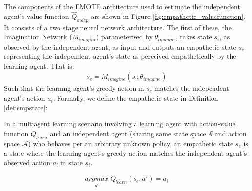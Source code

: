 The components of the EMOTE architecture used to estimate the independent agent's value function $\hat{Q}_{indep}$ are shown in Figure \ref{fig:empathetic_valuefunction}. It consists of a two stage neural network architecture. The first of these, the Imagination Network ($M_{imagine}$) parameterised by $\theta_{imagine}$, takes state $s_{i}$, as observed by the independent agent, as input and outputs an empathetic state $s_{e}$ representing the independent agent's state as perceived empathetically by the learning agent. That is:
\begin{eqnarray}
s_{e} = M_{imagine}(s_{i};\theta_{imagine})
\label{eqn:IM_formula}
\end{eqnarray} 
Such that the learning agent's greedy action in $s_e$ matches the independent agent's action $a_i$. Formally, we define the empathetic state in Definition \ref{def:empstate}:
\begin{definition}
\label{def:empstate}
In a multiagent learning scenario involving a learning agent with action-value function $Q_{learn}$ and an independent agent (sharing same state space $\mathcal{S}$ and action space $\mathcal{A}$) who behaves per an arbitrary unknown policy, an empathetic state $s_e$ is a state where the learning agent's greedy action matches the independent agent's observed action $a_i$ in state $s_{i}$.

\begin{eqnarray*}
 \underset{a'}{argmax}{ 
 \; Q_{learn}(s_{e},a')} = a_{i}
\label{eqn:IM_condition}
\end{eqnarray*}
\end{definition}

